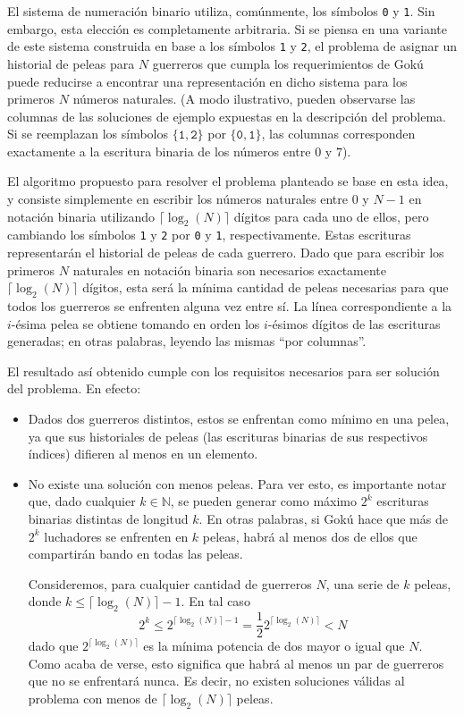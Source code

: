         El sistema de numeración binario utiliza, comúnmente, los símbolos \texttt{0} y \texttt{1}. Sin embargo, esta elección es completamente arbitraria. Si se piensa en una variante de este sistema construida en base a los símbolos \texttt{1} y \texttt{2}, el problema de asignar un historial de peleas para $N$ guerreros que cumpla los requerimientos de Gokú puede reducirse a encontrar una representación en dicho sistema para los primeros $N$ números naturales. (A modo ilustrativo, pueden observarse las columnas de las soluciones de ejemplo expuestas en la descripción del problema. Si se reemplazan los símbolos $\lbrace\mathtt{1},\mathtt{2}\rbrace$ por $\lbrace\mathtt{0},\mathtt{1}\rbrace$, las columnas corresponden exactamente a la escritura binaria de los números entre $0$ y $7$).

        El algoritmo propuesto para resolver el problema planteado se base en esta idea, y consiste simplemente en escribir los números naturales entre $0$ y $N-1$ en notación binaria utilizando $\lceil \log_2(N) \rceil$ dígitos para cada uno de ellos, pero cambiando los símbolos \texttt{1} y \texttt{2} por \texttt{0} y \texttt{1}, respectivamente. Estas escrituras representarán el historial de peleas de cada guerrero. Dado que para escribir los primeros $N$ naturales en notación binaria son necesarios exactamente $\lceil\log_2(N)\rceil$ dígitos, esta será la mínima cantidad de peleas necesarias para que todos los guerreros se enfrenten alguna vez entre sí. La línea correspondiente a la $i$-ésima pelea se obtiene tomando en orden los $i$-ésimos dígitos de las escrituras generadas; en otras palabras, leyendo las mismas ``por columnas''.

        El resultado así obtenido cumple con los requisitos necesarios para ser solución del problema. En efecto:
        \begin{itemize}
            \item Dados dos guerreros distintos, estos se enfrentan como mínimo en una pelea, ya que sus historiales de peleas (las escrituras binarias de sus respectivos índices) difieren al menos en un elemento.

            \item No existe una solución con menos peleas. Para ver esto, es importante notar que, dado cualquier $k \in \mathbb{N}$, se pueden generar como máximo $2^k$ escrituras binarias distintas de longitud $k$. En otras palabras, si Gokú hace que más de $2^k$ luchadores se enfrenten en $k$ peleas, habrá al menos dos de ellos que compartirán bando en todas las peleas.

            Consideremos, para cualquier cantidad de guerreros $N$, una serie de $k$ peleas, donde $k \leq \lceil \log_2(N) \rceil - 1$. En tal caso
            \[ 2^k \leq 2^{\lceil \log_2(N) \rceil - 1} = \frac{1}{2} 2^{\lceil \log_2(N) \rceil} < N\]
            dado que $ 2^{\lceil \log_2(N) \rceil}$ es la mínima potencia de dos mayor o igual que $N$. Como acaba de verse, esto significa que habrá al menos un par de guerreros que no se enfrentará nunca. Es decir, no existen soluciones válidas al problema con menos de $\lceil \log_2(N) \rceil$ peleas.
        \end{itemize}

